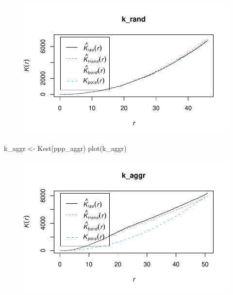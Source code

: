 \documentclass[
  letterpaper,
  DIV=11,
  numbers=noendperiod]{scrreprt}
\newenvironment{Shaded}{\begin{snugshade}}{\end{snugshade}}
\newcommand{\FunctionTok}[1]{\textcolor[rgb]{0.28,0.35,0.67}{#1}}
\newcommand{\NormalTok}[1]{\textcolor[rgb]{0.00,0.23,0.31}{#1}}
\newcommand{\OtherTok}[1]{\textcolor[rgb]{0.00,0.23,0.31}{#1}}
\begin{document}
\begin{figure}[H]

{\centering \includegraphics{spatial-tests_files/figure-pdf/unnamed-chunk-37-1.pdf}

}

\end{figure}

\begin{Shaded}
\begin{Highlighting}[]
\NormalTok{k\_aggr }\OtherTok{\textless{}{-}} \FunctionTok{Kest}\NormalTok{(ppp\_aggr)}
\FunctionTok{plot}\NormalTok{(k\_aggr)}
\end{Highlighting}
\end{Shaded}

\begin{figure}[H]

{\centering \includegraphics{spatial-tests_files/figure-pdf/unnamed-chunk-37-2.pdf}

}

\end{figure}
\end{document}
